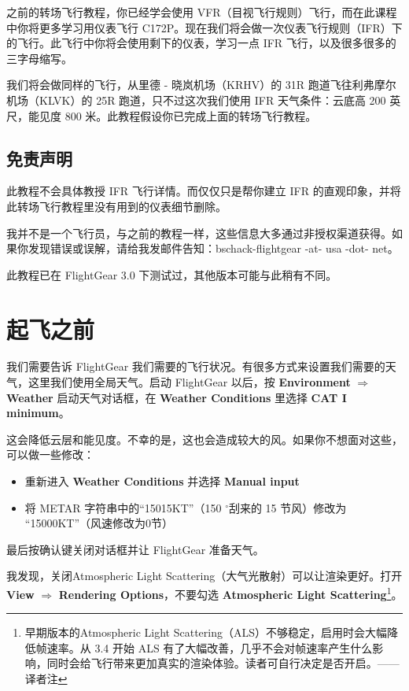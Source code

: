 之前的转场飞行教程，你已经学会使用 VFR（目视飞行规则）飞行，而在此课程中你将更多学习用仪表飞行 C172P。现在我们将会做一次仪表飞行规则（IFR）下的飞行。此飞行中你将会使用剩下的仪表，学习一点 IFR 飞行，以及很多很多的三字母缩写。

我们将会做同样的飞行，从里德 - 晓岚机场（KRHV）的 31R 跑道飞往利弗摩尔机场（KLVK）的 25R 跑道，只不过这次我们使用 IFR 天气条件：云底高 200 英尺，能见度 800 米。此教程假设你已完成上面的转场飞行教程。

\subsection{免责声明}

此教程不会具体教授 IFR 飞行详情。而仅仅只是帮你建立 IFR 的直观印象，并将此转场飞行教程里没有用到的仪表细节删除。

我并不是一个飞行员，与之前的教程一样，这些信息大多通过非授权渠道获得。如果你发现错误或误解，请给我发邮件告知：bschack-flightgear -at- usa -dot- net。

此教程已在 FlightGear 3.0 下测试过，其他版本可能与此稍有不同。

\section{起飞之前}

我们需要告诉 FlightGear 我们需要的飞行状况。有很多方式来设置我们需要的天气，这里我们使用全局天气。启动 FlightGear 以后，按 \textbf{\textsf{Environment}} $\Rightarrow$ \textbf{\textsf{Weather}} 启动天气对话框，在 \textbf{\textsf{Weather Conditions}} 里选择 \textbf{\textsf{CAT I minimum}}。

这会降低云层和能见度。不幸的是，这也会造成较大的风。如果你不想面对这些，可以做一些修改：

\begin{itemize}
\item 重新进入 \textbf{\textsf{Weather Conditions}} 并选择
  \textbf{\textsf{Manual input}}
\item 将 METAR 字符串中的``15015KT''（150 $^\circ$刮来的 15 节风）修改为 ``15000KT''（风速修改为0节）
\end{itemize}

最后按确认键关闭对话框并让 FlightGear 准备天气。

我发现，关闭Atmospheric Light Scattering（大气光散射）可以让渲染更好。打开 \textbf{\textsf{View}} $\Rightarrow$ \textbf{\textsf{Rendering Options}}，不要勾选 \textbf{\textsf{Atmospheric Light Scattering}}\footnote{早期版本的Atmospheric Light Scattering（ALS）不够稳定，启用时会大幅降低帧速率。从 3.4 开始 ALS 有了大幅改善，几乎不会对帧速率产生什么影响，同时会给飞行带来更加真实的渲染体验。读者可自行决定是否开启。——译者注}。

